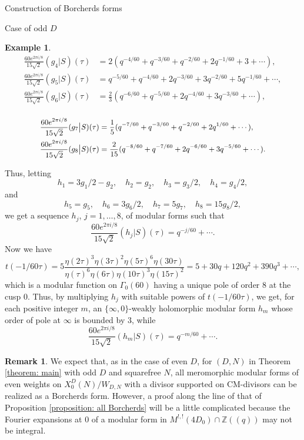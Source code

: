 \documentclass{amsart}
\newcounter{lemma}
\theoremstyle{definition}
\newtheorem{Example}[lemma]{Example}
\newtheorem{Remark}[lemma]{Remark}
\def\Z{\mathbb Z}
\begin{document}
\begin{section}{Construction of Borcherds forms}
\begin{subsection}{Case of odd $D$}
\begin{Example}
\begin{equation*}
\begin{split}
  \frac{60e^{2\pi i/8}}{15\sqrt2}(g_4\big|S)(\tau)
  &=2(q^{-4/60}+q^{-3/60}+q^{-2/60}+2q^{-1/60}+3+\cdots), \\
  \frac{60e^{2\pi i/8}}{15\sqrt2}(g_5\big|S)(\tau)
  &=q^{-5/60}+q^{-4/60}+2q^{-3/60}+3q^{-2/60}+5q^{-1/60}+\cdots, \\
  \frac{60e^{2\pi i/8}}{15\sqrt2}(g_6\big|S)(\tau)
  &=\frac23(q^{-6/60}+q^{-5/60}+2q^{-4/60}+3q^{-3/60}+\cdots), \\
  \end{split}
  \end{equation*}

 \begin{equation*} \small
  \begin{split}
  \frac{60e^{2\pi i/8}}{15\sqrt2}(g_7\big|S)(\tau)
  &=\frac1{5}(q^{-7/60}+q^{-3/60}+q^{-2/60}+2q^{1/60}+\cdots), \\
  \frac{60e^{2\pi i/8}}{15\sqrt2}(g_8\big|S)(\tau)
  &=\frac2{15}(q^{-8/60}+q^{-7/60}+2q^{-6/60}+3q^{-5/60}+\cdots).
  \end{split}
  \end{equation*}

  Thus, letting
  $$
    h_1=3g_1/2-g_2, \quad h_2=g_2, \quad h_3=g_3/2, \quad h_4=g_4/2,
  $$
  and
  $$
    h_5=g_5, \quad h_6=3g_6/2, \quad h_7=5g_7, \quad h_8=15g_8/2,
  $$
  we get a sequence $h_j$, $j=1,\ldots,8$, of modular forms such that
  $$
    \frac{60e^{2\pi i/8}}{15\sqrt2}(h_j\big|S)(\tau)
   =q^{-j/60}+\cdots.
  $$
  Now we have
  $$
    t(-1/60\tau)=5\frac{\eta(2\tau)^3\eta(3\tau)^2\eta(5\tau)^6\eta(30\tau)}
    {\eta(\tau)^6\eta(6\tau)\eta(10\tau)^3\eta(15\tau)^2}
   =5+30q+120q^2+390q^3+\cdots,
  $$
  which is a modular function on $\Gamma_0(60)$ having a unique pole
  of order $8$ at the cusp $0$.
  Thus, by multiplying $h_j$ with suitable powers of $t(-1/60\tau)$, we
  get, for each positive integer $m$, an $\{\infty,0\}$-weakly
  holomorphic modular form $h_m$ whose order of pole at $\infty$ is
  bounded by $3$, while
  $$
    \frac{60e^{2\pi i/8}}{15\sqrt2}(h_m\big|S)(\tau)=q^{-m/60}+\cdots.
  $$
\end{Example}

\begin{Remark}
  We expect that, as in the case of even $D$, for $(D,N)$ in Theorem \ref{theorem: main} with
  odd $D$ and squarefree $N$, all meromorphic modular forms of even
  weights on $X_0^D(N)/W_{D,N}$ with a divisor supported on
  CM-divisors can be realized as a Borcherds form. However, a proof
  along the line of that of Proposition \ref{proposition: all
    Borcherds} will be a little complicated because the Fourier
  expansions at $0$ of a modular form in $M^{!,!}(4D_0)\cap\Z((q))$
  may not be integral.
\end{Remark}


\end{subsection}
\end{section}
\end{document}
